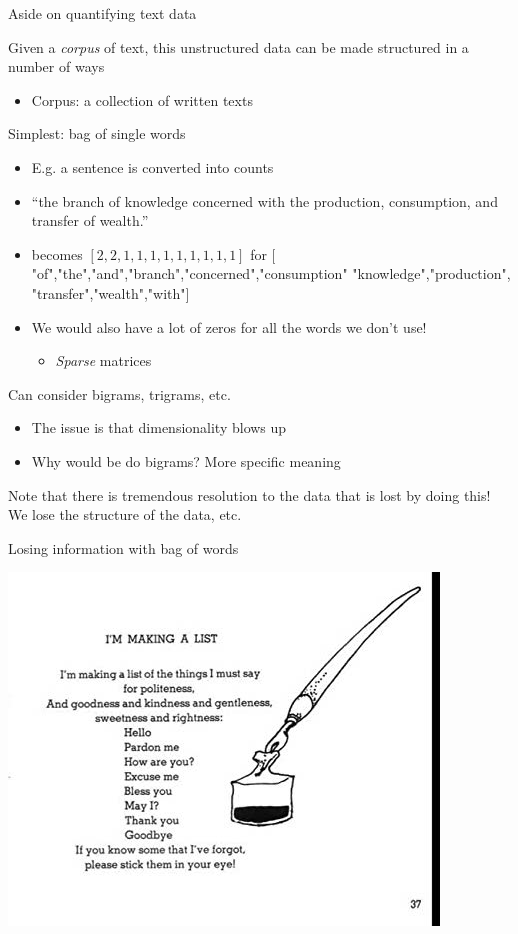 \documentclass[notes,11pt, aspectratio=169]{beamer}
\newenvironment{wideitemize}{\itemize\addtolength{\itemsep}{10pt}}{\enditemize}
\begin{document}
\begin{frame}{Aside on quantifying text data }
  \begin{wideitemize}
  \item Given a \emph{corpus} of text, this unstructured data can be made structured in a number of ways
    \begin{itemize}
    \item Corpus: a collection of written texts
    \end{itemize}
  \item Simplest: bag of single words
    \begin{itemize}
    \item E.g. a sentence is converted into counts
    \item ``the branch of knowledge concerned with the production, consumption, and transfer of wealth.''
    \item becomes $[2, 2, 1, 1, 1, 1, 1, 1, 1, 1, 1]$ for $[$"of","the","and","branch","concerned","consumption" "knowledge","production", "transfer","wealth","with"$]$
    \item We would also have a lot of zeros for all the words we don't use!
      \begin{itemize}
      \item \emph{Sparse} matrices
      \end{itemize}
    \end{itemize}
  \item Can consider bigrams, trigrams, etc.
    \begin{itemize}
    \item The issue is that dimensionality blows up
    \item Why would be do bigrams? More specific meaning
    \end{itemize}
  \item Note that there is tremendous resolution to the data that is
    lost by doing this! We lose the structure of the data, etc.
  \end{wideitemize}
\end{frame}

\begin{frame}{Losing information with bag of words}
  \begin{center}
    \includegraphics[width=0.5\linewidth]{images/shel_silverstein.jpg}
  \end{center}
\end{frame}
\end{document}
